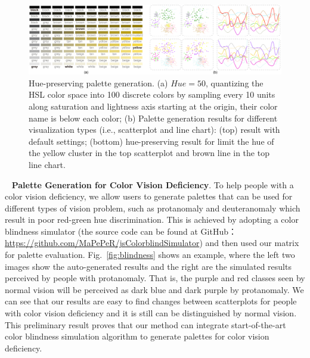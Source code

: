 \documentclass[review,onecolumn]{vgtc}                %
\newcommand{\myparagraph}[1]{\mbox{\ } \newline \noindent \textbf{#1}}
\renewcommand{\paragraph}[1]{\myparagraph{#1}}
\begin{document}
\begin{figure}[h]
\centering
\includegraphics[width=1\linewidth]{hue-preserving.pdf}
\caption{Hue-preserving palette generation. (a) $Hue=50$, quantizing the HSL color space into 100 discrete colors by sampling every 10 units along saturation and lightness axis starting at the origin, their color name is below each color; (b) Palette generation results for different visualization types (i.e., scatterplot and line chart): (top) result with default settings; (bottom) hue-preserving result for limit the hue of the yellow cluster in the top scatterplot and brown line in the top line chart.
}
\vspace*{-5mm}
\label{fig:huepreserving}
\end{figure}

\paragraph{Palette Generation for Color Vision Deficiency}.
To help people with a color vision deficiency, we allow users to generate palettes that can be used for different types of vision problem, such as protanomaly and deuteranomaly which result in poor red-green hue discrimination. This is achieved by adopting a color blindness simulator (the source code can be found at GitHub： \url{https://github.com/MaPePeR/jsColorblindSimulator}) and then used our matrix for palette evaluation. Fig.~\ref{fig:blindness} shows an example, where the left two images show the auto-generated results and the right are the simulated results perceived by people with protanomaly. That is, the purple and red classes seen by normal vision will be perceived as dark blue and dark purple by protanomaly. We can see that our results are easy to find changes between scatterplots for people with color vision deficiency and it is still can be distinguished by normal vision. This preliminary result proves that our method can integrate start-of-the-art color blindness simulation algorithm to generate palettes for color vision deficiency.
\end{document}
